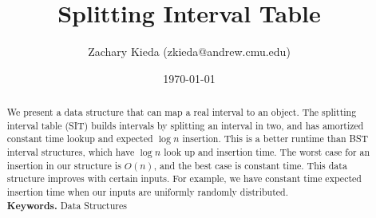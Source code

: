 \documentclass[11pt]{article}
\begin{document}
\title{Splitting Interval Table}
\author{Zachary Kieda (zkieda@andrew.cmu.edu)}
\date{\today}
\maketitle

\begin{abstract}
\setlength\parindent{0pt}
\noindent 
We present a data structure that can map a real interval to an object.
The splitting interval table (SIT) builds intervals by splitting an interval in two,
and has amortized constant time lookup and expected $\log n$ insertion. This is a better 
runtime than BST interval structures, which have $\log n$ look up and
insertion time. The worst case for an insertion in our structure is $O(n)$, and the best case
is constant time. This data structure improves with certain inputs. For example, we have constant
time expected insertion time when our inputs are uniformly randomly distributed.\\

\textbf{Keywords.} Data Structures
\end{abstract}
\end{document}
